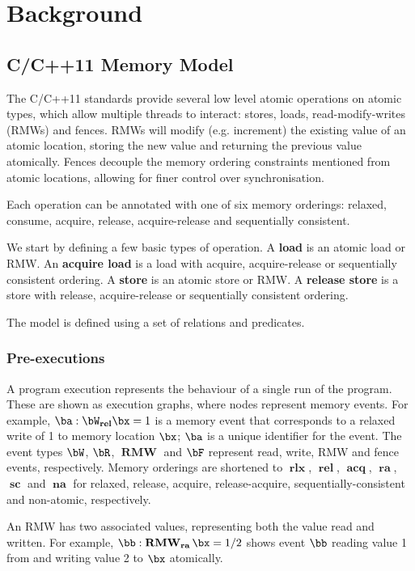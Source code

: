 \documentclass[11pt]{article}
\DeclareMathOperator{\RMW}{\textbf{RMW}}
\DeclareMathOperator{\rlx}{\textbf{rlx}}
\DeclareMathOperator{\rel}{\textbf{rel}}
\DeclareMathOperator{\acq}{\textbf{acq}}
\DeclareMathOperator{\bra}{\textbf{ra}}
\DeclareMathOperator{\bsc}{\textbf{sc}}
\DeclareMathOperator{\na}{\textbf{na}}
\begin{document}
\section{Background}
\label{sec:org8b434ac}
\subsection{C/C++11 Memory Model}
\label{sec:org47a71d4}
The C/C++11 standards provide several low level atomic operations on atomic types, which allow
multiple threads to interact: stores, loads, read-modify-writes (RMWs) and fences. RMWs will modify
(e.g. increment) the existing value of an atomic location, storing the new value and returning the
previous value atomically. Fences decouple the memory ordering constraints mentioned  from atomic
locations, allowing for finer control over synchronisation.

Each operation can be annotated with one of six memory orderings: relaxed, consume, acquire, release,
acquire-release and sequentially consistent.

We start by defining a few basic types of operation. A \textbf{load} is an atomic load or RMW. An \textbf{acquire load}
is a load with acquire, acquire-release or sequentially consistent ordering. A \textbf{store} is an atomic
store or RMW. A \textbf{release store} is a store with release, acquire-release or sequentially consistent
ordering.

The model is defined using a set of relations and predicates.
\subsubsection{Pre-executions}
\label{sec:org5ab1c0f}
A program execution represents the behaviour of a single run of the program. These are shown as
execution graphs, where nodes represent memory events. For example, \(\ba:\bW_{\textbf{rel}}\bx=1\)
is a memory event that corresponds to a relaxed write of 1 to memory location \(\bx\); \(\ba\) is a
unique identifier for the event. The event types \(\bW\), \(\bR\), \(\RMW\) and \(\bF\) represent
read, write, RMW and fence events, respectively. Memory orderings are shortened to \(\rlx\), \(\rel\),
\(\acq\), \(\bra\), \(\bsc\) and \(\na\) for relaxed, release, acquire, release-acquire,
sequentially-consistent and non-atomic, respectively.

An RMW has two associated values, representing both the value read and written. For example,
\(\bb:\RMW_{\bra}\bx=1/2\) shows event \(\bb\) reading value 1 from and writing value 2 to \(\bx\)
atomically.
\end{document}
